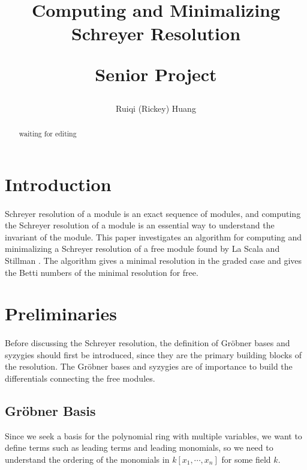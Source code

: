 \documentclass{article}
\title{Computing and Minimalizing Schreyer Resolution\\
\begin{large} 
  Senior Project
\end{large}}
\author{Ruiqi (Rickey) Huang}
\theoremstyle{definition}
\theoremstyle{remark}
\theoremstyle{example}
\begin{document}
\maketitle

\begin{abstract}
    \textcolor{BrickRed}{waiting for editing}
\end{abstract}

\section{Introduction}

\paragraph{  }

Schreyer resolution of a module is an exact sequence of modules, and computing the Schreyer resolution of a module is an essential way to understand the invariant of the module. This paper investigates an algorithm for computing and minimalizing a Schreyer resolution of a free module found by La Scala and Stillman \cite{la_scala_strategies_1998}. The algorithm gives a minimal resolution in the graded case and gives the Betti numbers of the minimal resolution for free.

\section{Preliminaries}

\paragraph{  }

Before discussing the Schreyer resolution, the definition of Gröbner bases and syzygies should first be introduced, since they are the primary building blocks of the resolution. The Gröbner bases and syzygies are of importance to build the differentials connecting the free modules.

\subsection{Gröbner Basis}

Since we seek a basis for the polynomial ring with multiple variables, we want to define terms such as leading terms and leading monomials, so we need to understand the ordering of the monomials in $k[x_1,\cdots,x_n]$ for some field $k$.
\end{document}
